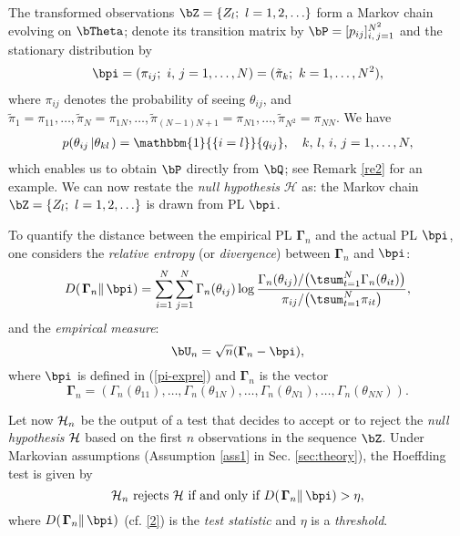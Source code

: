 \documentclass[10pt, twocolumn]{IEEEtran}
\begin{document}
The transformed observations $\bZ = \{ {{Z_l};~l =
    1,2, \ldots } \}$ form a Markov chain evolving on
${\bTheta}$; denote its transition matrix by $\bP = [ {{p_{ij}}}
]_{i,\,j = 1}^{{N^2}}$ and the stationary distribution by
\begin{align}
{{\bpi}} = ( {{\pi _{ij}}};~i,\,j = 1, \ldots, N )
= ( {{{\tilde {\pi}}_k}};~k = 1, \ldots, N^2 ),   \label{pi-expre}
\end{align} 
where
${{\pi _{ij}}}$ denotes the probability of seeing $\theta_{ij}$, and
${{\tilde {\pi}}_1} = {{\pi}_{11}}, \ldots, {{\tilde {\pi}}_N} =
{{\pi}_{1N}}, \ldots, {{\tilde {\pi}}_{\left( {N - 1} \right)N + 1}}
= {{\pi}_{N1}}, \ldots, {{\tilde {\pi}}_{{N^2}}} = {{\pi}_{NN}}$.
We have \cite{dembo1998large}
\begin{align}
p( {{\theta_{ij}}\left| {{\theta_{kl}}} \right.} ) =
\mathbbm{1}{\{ {i = l} \}}{q_{ij}}, \quad k,\,l,\,i,\,j = 1,
\ldots ,N, \label{QtoP}
\end{align}  
which enables us to obtain $\bP$ directly from $\bQ$; see Remark \ref{re2} for
an example.  We can now restate the \textit{null hypothesis} $\mathcal{H}$ as:
the Markov chain $\bZ = \{ {{Z_l};~l = 1,2, \ldots }\}$ is drawn from PL
$\bpi$.

To quantify the distance between the empirical PL $\boldsymbol{\Gamma} _n$ and
the actual PL ${\bpi}$, one considers the \textit{relative entropy} (or
\textit{divergence}) between ${\boldsymbol{\Gamma} _n}$ and ${{\bpi} }$: 
\begin{equation}
  D( {\left. \boldsymbol{\Gamma} _n \right\| \bpi }) = 
 \sum_{i = 1}^N \sum_{j = 1}^N \Gamma_n(\theta_{ij}) \log 
   \frac{\Gamma _n(\theta_{ij})/
            \big( \tsum_{t = 1}^N \Gamma _n(\theta_{it})\big)} 
{\pi _{ij}/ \big(\tsum_{t = 1}^N \pi _{it} \big)},
\label{2}
\end{equation}
and the \textit{empirical measure}:
\begin{equation}
{\bU_n} = \sqrt n ( {{\boldsymbol{\Gamma} _n} - {\bpi} } ),
\label{2.0}
\end{equation}
where $\bpi$ is defined in (\ref{pi-expre}) and $\boldsymbol{\Gamma}_n$ is
  the vector
\[ {\boldsymbol{\Gamma} _n} = ({{\Gamma _n}( {{\theta_{11}}} )},
\ldots, {{\Gamma _n}( {{\theta_{1N}}} )}, \ldots, {{\Gamma
    _n} ( {{\theta_{N1}}} )}, \ldots, {{\Gamma _n}(
  {{\theta_{NN}}} )}).\]

Let now ${{\cal{H}}_n}$ be the output of a test that decides to accept
or to reject the \textit{null hypothesis} $\cal H$ based on the first
$n$ observations in the sequence $\bZ$.  Under Markovian assumptions
(Assumption \ref{ass1} in Sec. \ref{sec:theory}), the Hoeffding test
\cite{dembo1998large} is given by
\begin{equation}
{{\cal{H}}_n} ~\text{rejects}~ {\cal{H}} ~\text{if and only if}~ D( {\left. {{\boldsymbol{\Gamma} _n}} \right\|{{\bpi}}}) > \eta, \label{333}
\end{equation}
where $D( {\left. {{\boldsymbol{\Gamma} _n}} \right\|{{\bpi}}})$
(cf. \eqref{2}) is the \textit{test statistic} and $\eta$ is a
\textit{threshold}. 
\end{document}
